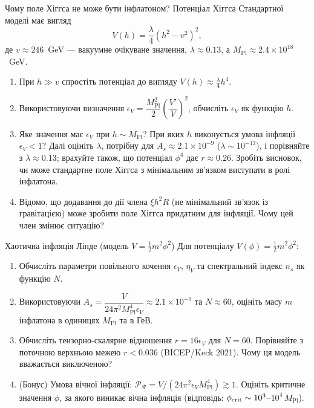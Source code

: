 \begin{problem}{Чому поле Хіггса не може бути інфлатоном?}
Потенціал Хіггса Стандартної моделі має вигляд
\[
V(h) = \frac{\lambda}{4}\left(h^2 - v^2\right)^2,
\]
де $v \approx 246$~GeV --- вакуумне очікуване значення, $\lambda \approx 0.13$,
а $M_{\mathrm{Pl}} \approx 2.4 \times 10^{18}$~GeV.

\begin{enumerate}
    \item При $h \gg v$ спростіть потенціал до вигляду $V(h) \approx \frac{\lambda}{4}h^4$.
    \item Використовуючи визначення $\epsilon_V = \dfrac{M_{\mathrm{Pl}}^2}{2}\left(\dfrac{V'}{V}\right)^2$,
          обчисліть $\epsilon_V$ як функцію $h$.
    \item Яке значення має $\epsilon_V$ при $h \sim M_{\mathrm{Pl}}$? При яких $h$ виконується
          умова інфляції $\epsilon_V < 1$? Далі оцініть $\lambda$, потрібну для $A_s\approx2.1\times10^{-9}$
          ($\lambda\sim10^{-13}$), і порівняйте з $\lambda\approx0.13$; врахуйте також, що потенціал $\phi^4$
          дає $r\approx0.26$. Зробіть висновок, чи може стандартне
          поле Хіггса з мінімальним зв'язком виступати в ролі інфлатона.
    \item Відомо, що додавання до дії члена $\xi h^2 R$ (не мінімальний зв'язок із гравітацією)
          може зробити поле Хіггса придатним для інфляції. Чому цей член змінює ситуацію?
\end{enumerate}
\end{problem}


\begin{problem}{Хаотична інфляція Лінде (модель $V = \frac{1}{2}m^2\phi^2$)}
Для потенціалу $V(\phi) = \frac{1}{2}m^2\phi^2$:

\begin{enumerate}
    \item Обчисліть параметри повільного кочення $\epsilon_V$, $\eta_V$ та
          спектральний індекс $n_s$ як функцію $N$.
    \item Використовуючи $A_s = \dfrac{V}{24\pi^2 M_{\mathrm{Pl}}^4 \epsilon_V} \approx 2.1\times10^{-9}$
          та $N \approx 60$, оцініть масу $m$ інфлатона в одиницях $M_{\mathrm{Pl}}$ та в ГеВ.
    \item Обчисліть тензорно-скалярне відношення $r = 16\epsilon_V$ для $N = 60$.
          Порівняйте з поточною верхньою межею $r < 0.036$ (BICEP/Keck 2021).
          Чому ця модель вважається виключеною?
    \item (Бонус) Умова вічної інфляції: $\mathcal{P}_{\mathcal{R}} = V/(24\pi^2\epsilon_V M_{\mathrm{Pl}}^4) \gtrsim 1$.
          Оцініть критичне значення $\phi$, за якого виникає вічна інфляція
          (відповідь: $\phi_{\rm crit}\sim 10^{3}$--$10^{4}\,M_{\mathrm{Pl}}$).
\end{enumerate}
\end{problem}